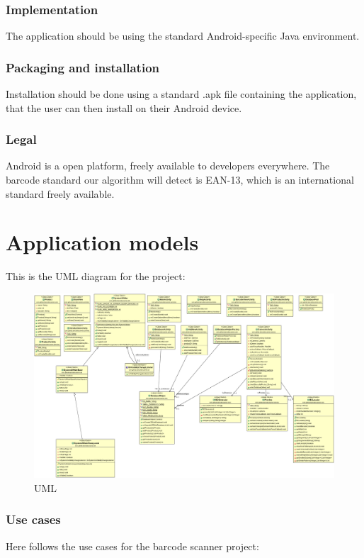 \documentclass{report}
\begin{document}
\subsection{Implementation}
The application should be using the standard Android-specific Java environment.

\subsection{Packaging and installation}
Installation should be done using a standard .apk file containing the application, that the user can then install on their Android device.

\subsection{Legal}
Android is a open platform, freely available to developers everywhere. The barcode standard our algorithm will detect is EAN-13, which is an international standard freely available.

\pagebreak

\chapter{Application models}
This is the UML diagram for the project:
\begin{figure}[H]
		\centering
		\includegraphics[width=\textwidth]{uml.png}
		\caption{UML}
		\label{fig:UML}
\end{figure}

\pagebreak



\subsection{Use cases}
Here follows the use cases for the barcode scanner project: 
\end{document}
